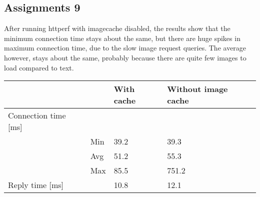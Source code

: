 \subsection{Assignments 9} 
After running httperf with imagecache disabled, the results show that the minimum connection time stays about the same, but there are huge spikes in maximum connection time, due to the slow image request queries. The average however, stays about the same, probably because there are quite few images to load compared to text.

\begin{table}[h]
\begin{tabular}{|ll|l|l|}
\hline
                                               &     & With cache & Without image cache \\ \hline
\multicolumn{1}{|l|}{Connection time {[}ms{]}} &     &            &               \\
\multicolumn{1}{|l|}{}                         & Min & 39.2       & 39.3          \\ \cline{2-4} 
\multicolumn{1}{|l|}{}                         & Avg & 51.2       & 55.3          \\ \cline{2-4} 
\multicolumn{1}{|l|}{}                         & Max & 85.5       & 751.2         \\ \hline
\multicolumn{1}{|l|}{Reply time {[}ms{]}}      &     & 10.8       & 12.1          \\ \hline
\end{tabular}
\end{table}